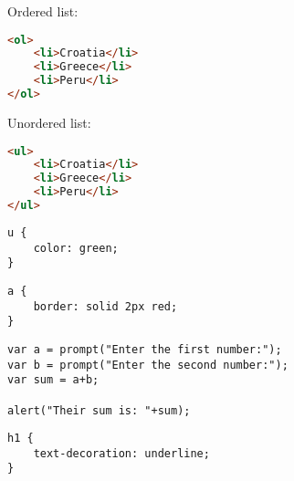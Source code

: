 \documentclass[]{memoir}
\begin{document}
Ordered list:

\begin{lstlisting}[language=HTML]
<ol>
    <li>Croatia</li>
    <li>Greece</li>
    <li>Peru</li>
</ol>
\end{lstlisting}

Unordered list:

\begin{lstlisting}[language=HTML]
<ul>
    <li>Croatia</li>
    <li>Greece</li>
    <li>Peru</li>
</ul>
\end{lstlisting}


\begin{lstlisting}
u {
    color: green;
}
\end{lstlisting}


\begin{lstlisting}
a {
    border: solid 2px red;
}
\end{lstlisting}


\begin{lstlisting}
var a = prompt("Enter the first number:");
var b = prompt("Enter the second number:");
var sum = a+b;

alert("Their sum is: "+sum);
\end{lstlisting}


\begin{lstlisting}
h1 {
    text-decoration: underline;
}
\end{lstlisting}
\end{document}
